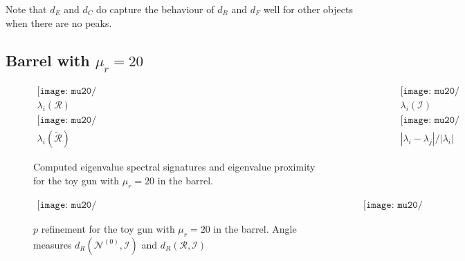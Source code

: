 \documentclass[a4paper,12]{article}
\theoremstyle{definition}
\begin{document}
  Note that $d_E$ and $d_C$ do capture the behaviour of $d_R$ and $d_F$ well for other objects when there are no peaks.



\clearpage
{}
\subsection{Barrel with $\mu_r=20$}

\begin{figure}[h]
\begin{center}
$\begin{array}{cc}
\texttt{[image: mu20/OCC\_Gun\_modelv2\_nonsym\_StainSt\_eig\_R\_al\_0.01\_20,1\_sig\_1e6,1e8\_ord\_5.pdf]} &
\texttt{[image: mu20/OCC\_Gun\_modelv2\_nonsym\_StainSt\_eig\_I\_al\_0.01\_20,1\_sig\_1e6,1e8\_ord\_5.pdf]} \\
\lambda_i({\mathcal R}) &\lambda_i({\mathcal I}) \\

\texttt{[image: mu20/OCC\_Gun\_modelv2\_nonsym\_StainSt\_eig\_Rtilde\_al\_0.01\_20,1\_sig\_1e6,1e8\_ord\_5.pdf]} &
\texttt{[image: mu20/OCC\_Gun\_modelv2\_nonsym\_StainSt\_eig\_prox\_al\_0.01\_20,1\_sig\_1e6,1e8\_ord\_5.pdf]} \\
\lambda_i(\tilde{\mathcal R}) & | \lambda_i -\lambda_j|/|\lambda_i| 
\end{array}$
\end{center}
\caption{Computed  eigenvalue spectral signatures and eigenvalue proximity  for the toy gun with $\mu_r=20$ in the barrel.  }
\end{figure}


\begin{figure}[h]
\begin{center}
$\begin{array}{cc}
\texttt{[image: mu20/OCC\_Gun\_modelv2\_nonsym\_StainSt\_N0I\_al\_0.01\_20,1\_sig\_1e6,1e8\_pref.pdf]} &
\texttt{[image: mu20/OCC\_Gun\_modelv2\_nonsym\_StainSt\_RI\_al\_0.01\_20,1\_sig\_1e6,1e8\_pref.pdf]} 
\end{array}$
\end{center}
\caption{$p$ refinement for the toy gun with $\mu_r=20$ in the barrel. Angle measures $d_R({\mathcal N}^{(0)}, {\mathcal I})$ and  $d_R({\mathcal R}, {\mathcal I})$}
\end{figure}
\end{document}
